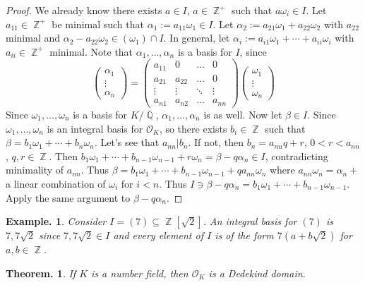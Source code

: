 \documentclass[11pt, a4paper]{memoir}
\DeclareMathOperator{\Q}{{\mathbb{Q}}}
\DeclareMathOperator{\Z}{{\mathbb{Z}}}
\theoremstyle{change}
\newtheorem{theorem}{Theorem.}[section]
\theoremstyle{plain}
\theoremstyle{nonumberplain}
\newtheorem{example}{Example.}
\newtheorem{proof}{Proof}
\numberwithin{equation}{section}
\begin{document}
\begin{proof}
    We already know there exists $a\in I$, $a\in\Z^+$ such that $a\omega_i\in I$.
    Let $a_{11}\in\Z^+$ be minimal such that $\alpha_1:=a_{11}\omega_1\in I$.
    Let $\alpha_2:=a_{21}\omega_1+a_{22}\omega_2$ with $a_{22}$ minimal and $\alpha_2-a_{22}\omega_2\in(\omega_1)\cap I$.
    In general, let $\alpha_i:=a_{i1}\omega_1+\cdots+a_{ii}\omega_i$ with $a_{ii}\in\Z^+$ minimal.
    Note that $\alpha_1,\ldots,\alpha_n$ is a basis for $I$, since
    \begin{equation*}
        \begin{pmatrix}\alpha_1\\\vdots\\\alpha_n\end{pmatrix} = \begin{pmatrix}a_{11}&0&\hdots&0\\a_{21}&a_{22}&\hdots&0\\\vdots&\vdots&\ddots&\vdots\\a_{n1}&a_{n2}&\hdots&a_{nn}\end{pmatrix}
        \begin{pmatrix}\omega_1\\\vdots\\\omega_n\end{pmatrix}
    \end{equation*}
    Since $\omega_1,\ldots,\omega_n$ is a basis for $K/\Q$, $\alpha_1,\ldots,\alpha_n$ is as well.
    Now let $\beta\in I$.
    Since $\omega_1,\ldots,\omega_n$ is an integral basis for $\mathcal{O}_K$, so there exists $b_i\in\Z$ such that $\beta=b_1\omega_1+\cdots+b_n\omega_n$.
    Let's see that $a_{nn}|b_n$.
    If not, then $b_n=a_{nn}q+r$, $0<r<a_{nn}$, $q,r\in\Z$.
    Then $b_1\omega_1+\cdots+b_{n-1}\omega_{n-1}+r\omega_n=\beta-q\alpha_n\in I$, contradicting minimality of $a_{nn}$.
    Thus $\beta=b_1\omega_1+\cdots+b_{n-1}\omega_{n-1}+qa_{nn}\omega_n$ where $a_{nn}\omega_n=\alpha_n+$ a linear combination of $\omega_i$ for $i<n$.
    Thus $I\ni\beta-q\alpha_n=b_1\omega_1+\cdots+b_{n-1}\omega_{n-1}$.
    Apply the same argument to $\beta-q\alpha_n$.
\end{proof}
\begin{example}
    Consider $I=(7)\subseteq\Z[\sqrt{2}]$.
    An integral basis for $(7)$ is $7,7\sqrt{2}$ since $7,7\sqrt{2}\in I$ and every element of $I$ is of the form $7(a+b\sqrt{2})$ for $a,b\in\Z$.
\end{example}
\begin{theorem}
    If $K$ is a number field, then $\mathcal{O}_K$ is a Dedekind domain.
\end{theorem}
\end{document}
